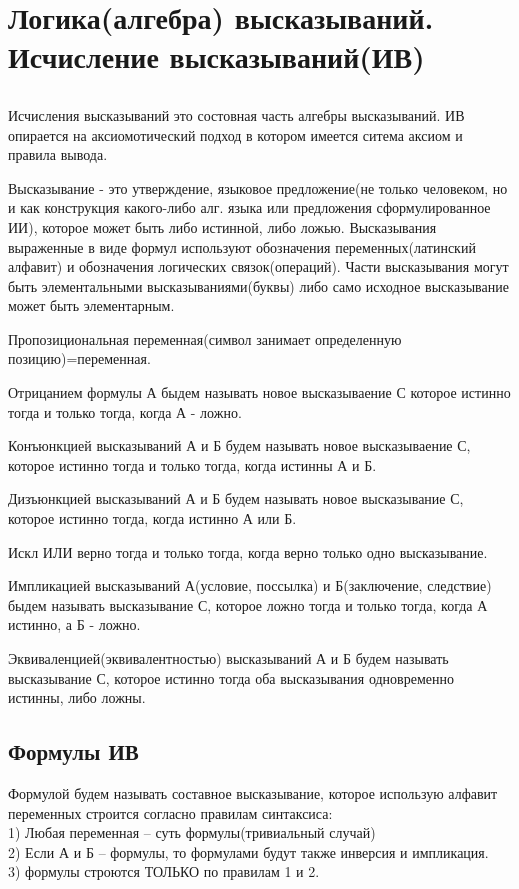 \documentclass[a4paper, 12pt]{article}
\begin{document}
\section{Логика(алгебра) высказываний. Исчисление высказываний(ИВ)}
\subsection{}
Исчисления высказываний это состовная часть алгебры высказываний. ИВ опирается на аксиомотический подход в котором имеется ситема аксиом и правила вывода.

Высказывание - это утверждение, языковое предложение(не только человеком, но и как конструкция какого-либо алг. языка или предложения сформулированное ИИ), которое может быть либо истинной, либо ложью. Высказывания выраженные в виде формул используют обозначения переменных(латинский алфавит) и обозначения логических связок(операций). Части высказывания могут быть элементальными высказываниями(буквы) либо само исходное высказывание может быть элементарным.

Пропозициональная переменная(символ занимает определенную позицию)=переменная.

Отрицанием формулы А быдем называть новое высказываение С которое истинно тогда и только тогда, когда А - ложно.

Конъюнкцией высказываний А и Б будем называть новое высказываение С, которое истинно тогда и только тогда, когда истинны А и Б.

Дизъюнкцией высказываний А и Б будем называть новое высказывание С, которое истинно тогда, когда истинно А или Б.

Искл ИЛИ верно тогда и только тогда, когда верно только одно высказывание.

Импликацией высказываний А(условие, поссылка) и Б(заключение, следствие) быдем называть высказывание С, которое ложно тогда и только тогда, когда А истинно, а Б - ложно.

Эквиваленцией(эквивалентностью) высказываний А и Б будем называть высказывание С, которое истинно тогда оба высказывания одновременно истинны, либо ложны.

\subsection{Формулы ИВ}
Формулой будем называть составное высказывание, которое использую алфавит переменных строится согласно правилам синтаксиса:\\
1) Любая переменная -- суть формулы(тривиальный случай)\\
2) Если А и Б -- формулы, то формулами будут также инверсия и импликация.\\
3) формулы строются ТОЛЬКО по правилам 1 и 2.\\
\end{document}
